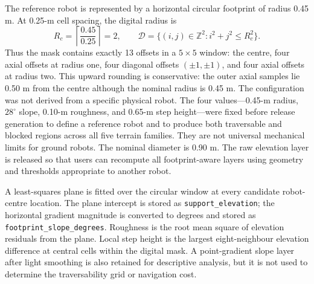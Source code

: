 \documentclass[11pt]{article}
\begin{document}
The reference robot is represented by a horizontal circular footprint of
radius 0.45 m. At 0.25-m cell spacing, the digital radius is
\begin{equation}
  R_c=\left\lceil\frac{0.45}{0.25}\right\rceil=2,
  \qquad
  \mathcal{D}=\{(i,j)\in\mathbb{Z}^2:i^2+j^2\leq R_c^2\}.
\end{equation}
Thus the mask contains exactly 13 offsets in a $5\times5$ window: the centre,
four axial offsets at radius one, four diagonal offsets $(\pm1,\pm1)$, and four
axial offsets at radius two. This upward rounding is conservative: the outer
axial samples lie 0.50 m from the centre although the nominal radius is 0.45 m.
The configuration was not derived from a specific physical robot. The four values---0.45-m radius, $28^\circ$ slope,
0.10-m roughness, and 0.65-m step height---were fixed before release generation
to define a reference robot and to produce both traversable and blocked regions
across all five terrain families. They are not universal mechanical limits for
ground robots. The nominal diameter is 0.90 m. The raw elevation layer is
released so that users can recompute all footprint-aware layers using geometry
and thresholds appropriate to another robot.

A least-squares plane is fitted over the circular window at every candidate
robot-centre location. The plane intercept is stored as
\texttt{support\_elevation}; the horizontal gradient magnitude is converted to
degrees and stored as \texttt{footprint\_slope\_degrees}. Roughness is the root
mean square of elevation residuals from the plane. Local step height is the
largest eight-neighbour elevation difference at central cells within the
digital mask. A point-gradient slope layer after light smoothing is also retained
for descriptive analysis, but it is not used to determine the traversability
grid or navigation cost.
\end{document}

